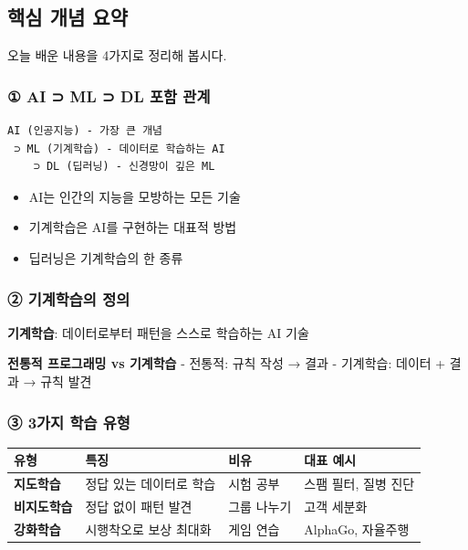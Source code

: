 \documentclass[a4paper, 11pt]{article}
\providecommand{\tightlist}{%
  \setlength{\itemsep}{0pt}\setlength{\parskip}{0pt}}
\renewenvironment{quote}
  {\begin{tcolorbox}[colback=lightblue!30, colframe=mainblue!50,
   left=8pt, right=8pt, top=4pt, bottom=4pt, breakable]}
  {\end{tcolorbox}}
\begin{document}
\hypertarget{uxd575uxc2ec-uxac1cuxb150-uxc694uxc57d}{%
\subsection{핵심 개념
요약}\label{uxd575uxc2ec-uxac1cuxb150-uxc694uxc57d}}

오늘 배운 내용을 4가지로 정리해 봅시다.

\hypertarget{ai-ml-dl-uxd3ecuxd568-uxad00uxacc4}{%
\subsubsection{\textbf{①} AI ⊃ ML ⊃ DL 포함
관계}\label{ai-ml-dl-uxd3ecuxd568-uxad00uxacc4}}

\begin{verbatim}
AI (인공지능) - 가장 큰 개념
 ⊃ ML (기계학습) - 데이터로 학습하는 AI
    ⊃ DL (딥러닝) - 신경망이 깊은 ML
\end{verbatim}

\begin{itemize}
\tightlist
\item
  AI는 인간의 지능을 모방하는 모든 기술
\item
  기계학습은 AI를 구현하는 대표적 방법
\item
  딥러닝은 기계학습의 한 종류
\end{itemize}

\hypertarget{uxae30uxacc4uxd559uxc2b5uxc758-uxc815uxc758}{%
\subsubsection{\textbf{②} 기계학습의
정의}\label{uxae30uxacc4uxd559uxc2b5uxc758-uxc815uxc758}}

\begin{quote}
\textbf{기계학습}: 데이터로부터 패턴을 스스로 학습하는 AI 기술
\end{quote}

\textbf{전통적 프로그래밍 vs 기계학습} - 전통적: 규칙 작성 → 결과 -
기계학습: 데이터 + 결과 → 규칙 발견

\hypertarget{uxac00uxc9c0-uxd559uxc2b5-uxc720uxd615}{%
\subsubsection{\textbf{③} 3가지 학습
유형}\label{uxac00uxc9c0-uxd559uxc2b5-uxc720uxd615}}

\begin{longtable}{p{2.5cm}p{3.5cm}p{4.0cm}p{4.0cm}}
\toprule\noalign{}
\textbf{유형} & \textbf{특징} & \textbf{비유} & \textbf{대표 예시} \\
\midrule\noalign{}
\endhead
\bottomrule\noalign{}
\endlastfoot
\textbf{지도학습} & 정답 있는 데이터로 학습 & 시험 공부 & 스팸 필터,
질병 진단 \\
\textbf{비지도학습} & 정답 없이 패턴 발견 & 그룹 나누기 & 고객 세분화 \\
\textbf{강화학습} & 시행착오로 보상 최대화 & 게임 연습 & AlphaGo,
자율주행 \\
\end{longtable}
\end{document}
